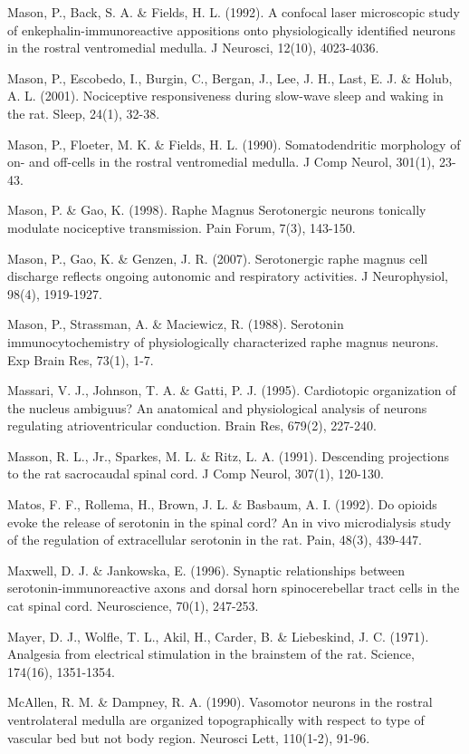 \documentclass[a4paper,12pt,twoside]{report}
\begin{document}
\begin{singlespacing}
\begin{footnotesize}
Mason, P., Back, S. A. \& Fields, H. L. (1992). A confocal laser microscopic study of enkephalin-immunoreactive appositions onto physiologically identified neurons in the rostral ventromedial medulla. J Neurosci, 12(10), 4023-4036.

Mason, P., Escobedo, I., Burgin, C., Bergan, J., Lee, J. H., Last, E. J. \& Holub, A. L. (2001). Nociceptive responsiveness during slow-wave sleep and waking in the rat. Sleep, 24(1), 32-38.

Mason, P., Floeter, M. K. \& Fields, H. L. (1990). Somatodendritic morphology of on- and off-cells in the rostral ventromedial medulla. J Comp Neurol, 301(1), 23-43.

Mason, P. \& Gao, K. (1998). Raphe Magnus Serotonergic neurons tonically modulate nociceptive transmission. Pain Forum, 7(3), 143-150.

Mason, P., Gao, K. \& Genzen, J. R. (2007). Serotonergic raphe magnus cell discharge reflects ongoing autonomic and respiratory activities. J Neurophysiol, 98(4), 1919-1927.

Mason, P., Strassman, A. \& Maciewicz, R. (1988). Serotonin immunocytochemistry of physiologically characterized raphe magnus neurons. Exp Brain Res, 73(1), 1-7.

Massari, V. J., Johnson, T. A. \& Gatti, P. J. (1995). Cardiotopic organization of the nucleus ambiguus? An anatomical and physiological analysis of neurons regulating atrioventricular conduction. Brain Res, 679(2), 227-240.

Masson, R. L., Jr., Sparkes, M. L. \& Ritz, L. A. (1991). Descending projections to the rat sacrocaudal spinal cord. J Comp Neurol, 307(1), 120-130.

Matos, F. F., Rollema, H., Brown, J. L. \& Basbaum, A. I. (1992). Do opioids evoke the release of serotonin in the spinal cord? An in vivo microdialysis study of the regulation of extracellular serotonin in the rat. Pain, 48(3), 439-447.

Maxwell, D. J. \& Jankowska, E. (1996). Synaptic relationships between serotonin-immunoreactive axons and dorsal horn spinocerebellar tract cells in the cat spinal cord. Neuroscience, 70(1), 247-253.

Mayer, D. J., Wolfle, T. L., Akil, H., Carder, B. \& Liebeskind, J. C. (1971). Analgesia from electrical stimulation in the brainstem of the rat. Science, 174(16), 1351-1354.

McAllen, R. M. \& Dampney, R. A. (1990). Vasomotor neurons in the rostral ventrolateral medulla are organized topographically with respect to type of vascular bed but not body region. Neurosci Lett, 110(1-2), 91-96.


\end{footnotesize}
\end{singlespacing}
\end{document}
